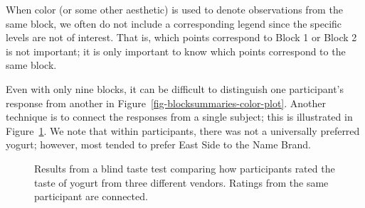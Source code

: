 \documentclass[
  letterpaper,
  DIV=11,
  numbers=noendperiod]{scrreprt}
\theoremstyle{definition}
\theoremstyle{definition}
\theoremstyle{plain}
\theoremstyle{remark}
\begin{document}
\begin{tcolorbox}[enhanced jigsaw, colbacktitle=quarto-callout-note-color!10!white, colback=white, left=2mm, title=\textcolor{quarto-callout-note-color}{\faInfo}\hspace{0.5em}{Note}, toptitle=1mm, leftrule=.75mm, breakable, bottomrule=.15mm, arc=.35mm, rightrule=.15mm, toprule=.15mm, coltitle=black, opacityback=0, colframe=quarto-callout-note-color-frame, opacitybacktitle=0.6, bottomtitle=1mm, titlerule=0mm]

When color (or some other aesthetic) is used to denote observations from
the same block, we often do not include a corresponding legend since the
specific levels are not of interest. That is, which points correspond to
Block 1 or Block 2 is not important; it is only important to know which
points correspond to the same block.

\end{tcolorbox}

Even with only nine blocks, it can be difficult to distinguish one
participant's response from another in
Figure~\ref{fig-blocksummaries-color-plot}. Another technique is to
connect the responses from a single subject; this is illustrated in
Figure~\ref{fig-blocksummaries-line-plot}. We note that within
participants, there was not a universally preferred yogurt; however,
most tended to prefer East Side to the Name Brand.

\begin{figure}


\caption{\label{fig-blocksummaries-line-plot}Results from a blind taste
test comparing how participants rated the taste of yogurt from three
different vendors. Ratings from the same participant are connected.}

\end{figure}%
\end{document}
